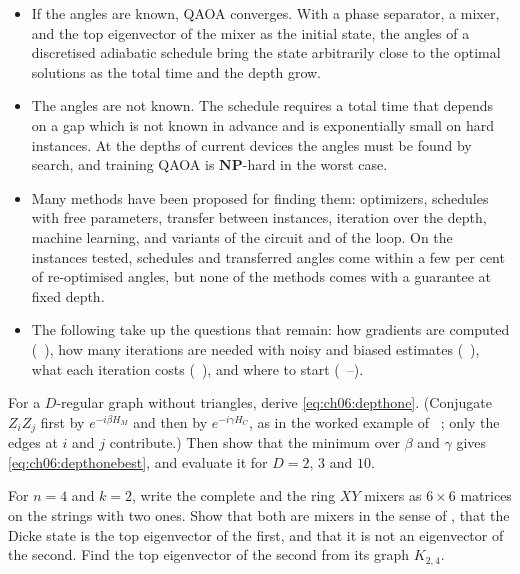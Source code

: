 \documentclass[handoutsbeamer.tex]{subfiles}
\begin{document}
\begin{frame}
\onp{\footnotesize}
\begin{itemize}\setlength\itemsep{0.3em}
    \item If the angles are known, QAOA converges. With a phase separator, a mixer, and the top eigenvector of the mixer as the initial state, the angles of a discretised adiabatic schedule bring the state arbitrarily close to the optimal solutions as the total time and the depth grow.
    \item The angles are not known. The schedule requires a total time that depends on a gap which is not known in advance and is exponentially small on hard instances. At the depths of current devices the angles must be found by search, and training QAOA is $\mathbf{NP}$-hard in the worst case.
    \item Many methods have been proposed for finding them: optimizers, schedules with free parameters, transfer between instances, iteration over the depth, machine learning, and variants of the circuit and of the loop. On the instances tested, schedules and transferred angles come within a few per cent of re-optimised angles, but none of the methods comes with a guarantee at fixed depth.
    \item The following \chaps{} take up the questions that remain: how gradients are computed (\Chap~), how many iterations are needed with noisy and biased estimates (\Chap~), what each iteration costs (\Chap~), and where to start (\Chaps~--).
\end{itemize}
\end{frame}


\begin{frame}
\onp{\footnotesize}
\begin{exe}\label{exe:ch06:depthone}
For a $D$-regular graph without triangles, derive \eqref{eq:ch06:depthone}. (Conjugate $Z_iZ_j$ first by $e^{-i\beta H_M}$ and then by $e^{-i\gamma H_C}$, as in the worked example of \Chap~; only the edges at $i$ and $j$ contribute.) Then show that the minimum over $\beta$ and $\gamma$ gives \eqref{eq:ch06:depthonebest}, and evaluate it for $D = 2$, $3$ and $10$.
\end{exe}
\begin{exe}[$XY$ mixers]
For $n = 4$ and $k = 2$, write the complete and the ring $XY$ mixers as $6\times6$ matrices on the strings with two ones. Show that both are mixers in the sense of , that the Dicke state is the top eigenvector of the first, and that it is not an eigenvector of the second. Find the top eigenvector of the second from its graph $K_{2,4}$.
\end{exe}
\end{frame}
\end{document}
